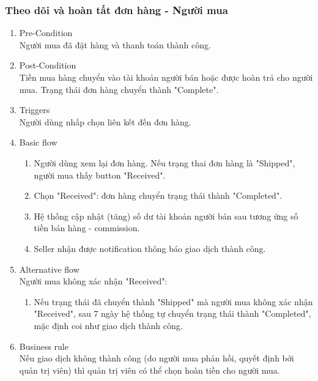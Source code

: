 \subsubsection{Theo dõi và hoàn tất đơn hàng - Người mua}
\begin{enumerate}
	\item Pre-Condition\\
	Người mua đã đặt hàng và thanh toán thành công.
	\item Post-Condition\\
	Tiền mua hàng chuyển vào tài khoản người bán hoặc được hoàn trả cho người mua. Trạng thái đơn hàng chuyển thành "Complete".
	\item Triggers\\
	Người dùng nhấp chọn liên kết đến đơn hàng.
	\item Basic flow
	\begin{enumerate}
		\item Người dùng xem lại đơn hàng. Nếu trạng thai đơn hàng là "Shipped", người mua thấy button "Received".
		\item Chọn "Received": đơn hàng chuyển trạng thái thành "Completed".
		\item Hệ thống cập nhật (tăng) số dư tài khoản người bán sau tương ứng số tiền bán hàng - commission.
		\item Seller nhận được notification thông báo giao dịch thành công.
	\end{enumerate}
	\item Alternative flow\\
	Người mua không xác nhận "Received":
	\begin{enumerate}
		\item Nếu trạng thái đã chuyển thành "Shipped" mà người mua không xác nhận "Received", sau 7 ngày hệ thống tự chuyển trạng thái thành "Completed", mặc định coi như giao dịch thành công.
	\end{enumerate}
	\item Business rule\\
	Nếu giao dịch không thành công (do người mua phản hồi, quyết định bởi quản trị viên) thì quản trị viên có thể chọn hoàn tiền cho người mua.
\end{enumerate}

